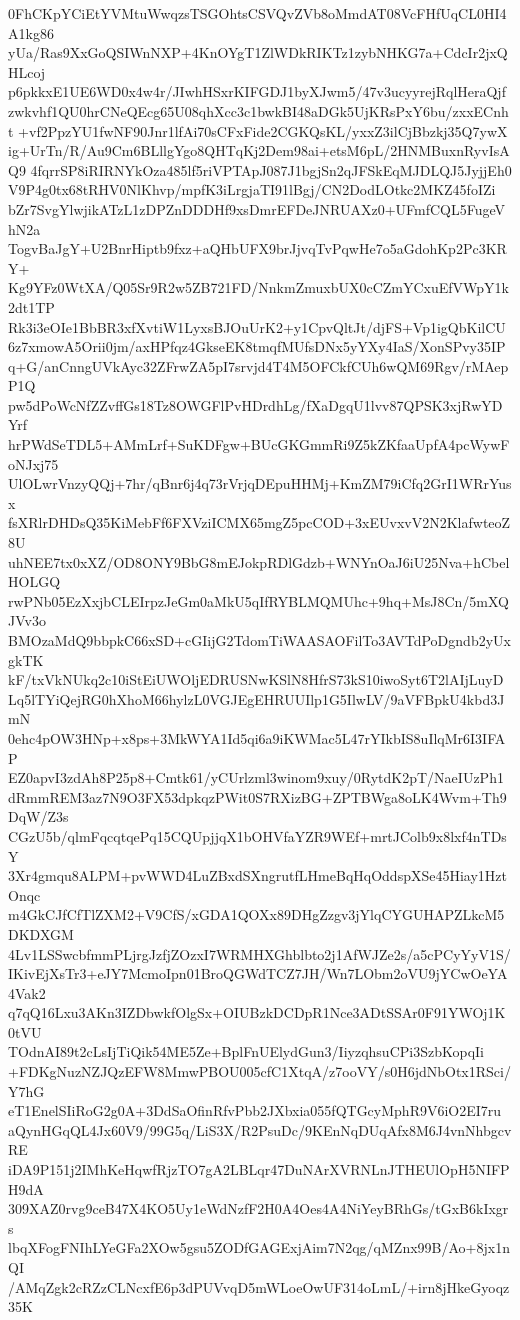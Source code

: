 0FhCKpYCiEtYVMtuWwqzsTSGOhtsCSVQvZVb8oMmdAT08VcFHfUqCL0HI4A1kg86
yUa/Ras9XxGoQSIWnNXP+4KnOYgT1ZlWDkRIKTz1zybNHKG7a+CdcIr2jxQHLcoj
p6pkkxE1UE6WD0x4w4r/JIwhHSxrKIFGDJ1byXJwm5/47v3ucyyrejRqlHeraQjf
zwkvhf1QU0hrCNeQEcg65U08qhXcc3c1bwkBI48aDGk5UjKRsPxY6bu/zxxECnht
+vf2PpzYU1fwNF90Jnr1lfAi70sCFxFide2CGKQsKL/yxxZ3ilCjBbzkj35Q7ywX
ig+UrTn/R/Au9Cm6BLllgYgo8QHTqKj2Dem98ai+etsM6pL/2HNMBuxnRyvIsAQ9
4fqrrSP8iRIRNYkOza485lf5riVPTApJ087J1bgjSn2qJFSkEqMJDLQJ5JyjjEh0
V9P4g0tx68tRHV0NlKhvp/mpfK3iLrgjaTI91lBgj/CN2DodLOtkc2MKZ45foIZi
bZr7SvgYlwjikATzL1zDPZnDDDHf9xsDmrEFDeJNRUAXz0+UFmfCQL5FugeVhN2a
TogvBaJgY+U2BnrHiptb9fxz+aQHbUFX9brJjvqTvPqwHe7o5aGdohKp2Pc3KRY+
Kg9YFz0WtXA/Q05Sr9R2w5ZB721FD/NnkmZmuxbUX0cCZmYCxuEfVWpY1k2dt1TP
Rk3i3eOIe1BbBR3xfXvtiW1LyxsBJOuUrK2+y1CpvQltJt/djFS+Vp1igQbKilCU
6z7xmowA5Orii0jm/axHPfqz4GkseEK8tmqfMUfsDNx5yYXy4IaS/XonSPvy35IP
q+G/anCnngUVkAyc32ZFrwZA5pI7srvjd4T4M5OFCkfCUh6wQM69Rgv/rMAepP1Q
pw5dPoWcNfZZvffGs18Tz8OWGFlPvHDrdhLg/fXaDgqU1lvv87QPSK3xjRwYDYrf
hrPWdSeTDL5+AMmLrf+SuKDFgw+BUcGKGmmRi9Z5kZKfaaUpfA4pcWywFoNJxj75
UlOLwrVnzyQQj+7hr/qBnr6j4q73rVrjqDEpuHHMj+KmZM79iCfq2GrI1WRrYusx
fsXRlrDHDsQ35KiMebFf6FXVziICMX65mgZ5pcCOD+3xEUvxvV2N2KlafwteoZ8U
uhNEE7tx0xXZ/OD8ONY9BbG8mEJokpRDlGdzb+WNYnOaJ6iU25Nva+hCbelHOLGQ
rwPNb05EzXxjbCLEIrpzJeGm0aMkU5qIfRYBLMQMUhc+9hq+MsJ8Cn/5mXQJVv3o
BMOzaMdQ9bbpkC66xSD+cGIijG2TdomTiWAASAOFilTo3AVTdPoDgndb2yUxgkTK
kF/txVkNUkq2c10iStEiUWOljEDRUSNwKSlN8HfrS73kS10iwoSyt6T2lAIjLuyD
Lq5lTYiQejRG0hXhoM66hylzL0VGJEgEHRUUIlp1G5IlwLV/9aVFBpkU4kbd3JmN
0ehc4pOW3HNp+x8ps+3MkWYA1Id5qi6a9iKWMac5L47rYIkbIS8uIlqMr6I3IFAP
EZ0apvI3zdAh8P25p8+Cmtk61/yCUrlzml3winom9xuy/0RytdK2pT/NaeIUzPh1
dRmmREM3az7N9O3FX53dpkqzPWit0S7RXizBG+ZPTBWga8oLK4Wvm+Th9DqW/Z3s
CGzU5b/qlmFqcqtqePq15CQUpjjqX1bOHVfaYZR9WEf+mrtJColb9x8lxf4nTDsY
3Xr4gmqu8ALPM+pvWWD4LuZBxdSXngrutfLHmeBqHqOddspXSe45Hiay1HztOnqc
m4GkCJfCfTlZXM2+V9CfS/xGDA1QOXx89DHgZzgv3jYlqCYGUHAPZLkcM5DKDXGM
4Lv1LSSwcbfmmPLjrgJzfjZOzxI7WRMHXGhblbto2j1AfWJZe2s/a5cPCyYyV1S/
IKivEjXsTr3+eJY7McmoIpn01BroQGWdTCZ7JH/Wn7LObm2oVU9jYCwOeYA4Vak2
q7qQ16Lxu3AKn3IZDbwkfOlgSx+OIUBzkDCDpR1Nce3ADtSSAr0F91YWOj1K0tVU
TOdnAI89t2cLsIjTiQik54ME5Ze+BplFnUElydGun3/IiyzqhsuCPi3SzbKopqIi
+FDKgNuzNZJQzEFW8MmwPBOU005cfC1XtqA/z7ooVY/s0H6jdNbOtx1RSci/Y7hG
eT1EnelSIiRoG2g0A+3DdSaOfinRfvPbb2JXbxia055fQTGcyMphR9V6iO2EI7ru
aQynHGqQL4Jx60V9/99G5q/LiS3X/R2PsuDc/9KEnNqDUqAfx8M6J4vnNhbgcvRE
iDA9P151j2IMhKeHqwfRjzTO7gA2LBLqr47DuNArXVRNLnJTHEUlOpH5NIFPH9dA
309XAZ0rvg9ceB47X4KO5Uy1eWdNzfF2H0A4Oes4A4NiYeyBRhGs/tGxB6kIxgrs
lbqXFogFNIhLYeGFa2XOw5gsu5ZODfGAGExjAim7N2qg/qMZnx99B/Ao+8jx1nQI
/AMqZgk2cRZzCLNcxfE6p3dPUVvqD5mWLoeOwUF314oLmL/+irn8jHkeGyoqz35K
